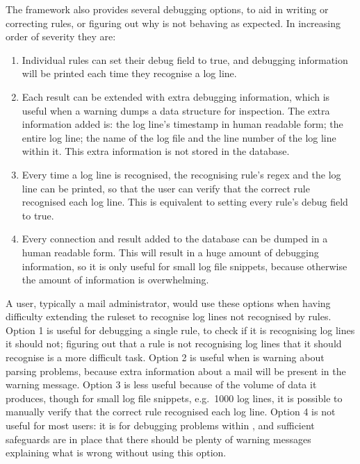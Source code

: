 The framework also provides several debugging options, to aid in writing or
correcting rules, or figuring out why \parsername{} is not behaving as
expected.  In increasing order of severity they are:

\begin{enumerate}

    \item Individual rules can set their debug field to true, and debugging
        information will be printed each time they recognise a log line.

    \item Each result can be extended with extra debugging information,
        which is useful when a warning dumps a data structure for
        inspection.  The extra information added is: the log line's
        timestamp in human readable form; the entire log line; the name of
        the log file and the line number of the log line within it.  This
        extra information is not stored in the database.

    \item Every time a log line is recognised, the recognising rule's regex
        and the log line can be printed, so that the user can verify that
        the correct rule recognised each log line.  This is equivalent to
        setting every rule's debug field to true.

    \item Every connection and result added to the database can be dumped
        in a human readable form.  This will result in a huge amount of
        debugging information, so it is only useful for small log file
        snippets, because otherwise the amount of information is
        overwhelming.

\end{enumerate}

A user, typically a mail administrator, would use these options when having
difficulty extending the ruleset to recognise log lines not recognised by
\parsernames{} \numberOFrules{} rules.  Option 1 is useful for debugging a
single rule, to check if it is recognising log lines it should not;
figuring out that a rule is not recognising log lines that it should
recognise is a more difficult task.  Option 2 is useful when \parsername{}
is warning about parsing problems, because extra information about a mail
will be present in the warning message.  Option 3 is less useful because of
the volume of data it produces, though for small log file snippets, e.g.\
1000 log lines, it is possible to manually verify that the correct rule
recognised each log line.  Option 4 is not useful for most users: it is for
debugging problems within \parsername{}, and sufficient safeguards are in
place that there should be plenty of warning messages explaining what is
wrong without using this option.

